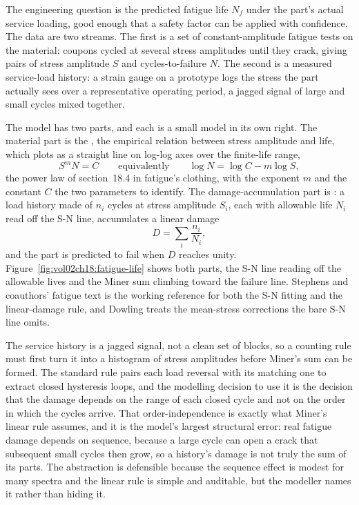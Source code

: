  The engineering question is the predicted
fatigue life $N_f$ under the part's actual service loading, good enough that a
safety factor can be applied with confidence. The data are two streams. The
first is a set of constant-amplitude fatigue tests on the material: coupons cycled
at several stress amplitudes until they crack, giving pairs of stress amplitude
$S$ and cycles-to-failure $N$. The second is a measured service-load history: a
strain gauge on a prototype logs the stress the part actually sees over a
representative operating period, a jagged signal of large and small cycles mixed
together.

 The model has two parts, and each is a small
model in its own right. The material part is the , the
empirical relation between stress amplitude and life, which plots as a straight
line on log-log axes over the finite-life range,
\[
S^{m} N = C
\qquad\text{equivalently}\qquad
\log N = \log C - m \log S,
\]
the power law of section~18.4 in fatigue's clothing, with the exponent $m$ and
the constant $C$ the two parameters to identify. The damage-accumulation part is
: a load history made of $n_i$ cycles at stress amplitude
$S_i$, each with allowable life $N_i$ read off the S-N line, accumulates a
linear damage
\[
D = \sum_i \frac{n_i}{N_i},
\]
and the part is predicted to fail when $D$ reaches unity.
Figure~\ref{fig:vol02ch18:fatigue-life} shows both parts, the S-N line reading
off the allowable lives and the Miner sum climbing toward the failure line.
Stephens and coauthors' fatigue text \cite{text:stephens-fatigue} is the working
reference for both the S-N fitting and the linear-damage rule, and Dowling
\cite{text:dowling-mechanical-behavior} treats the mean-stress corrections the
bare S-N line omits.



 The service
history is a jagged signal, not a clean set of blocks, so a counting rule must
first turn it into a histogram of stress amplitudes before Miner's sum can be
formed. The standard rule pairs each load reversal with its matching one to
extract closed hysteresis loops, and the modelling decision to use it is the
decision that the damage depends on the range of each closed cycle and not on the
order in which the cycles arrive. That order-independence is exactly what Miner's
linear rule assumes, and it is the model's largest structural error: real fatigue
damage depends on sequence, because a large cycle can open a crack that
subsequent small cycles then grow, so a history's damage is not truly the sum of
its parts. The abstraction is defensible because the sequence effect is modest for
many spectra and the linear rule is simple and auditable, but the modeller names
it rather than hiding it.

